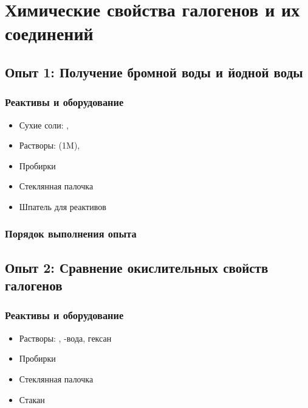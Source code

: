 \documentclass[a4paper, 12pt]{article}
\begin{document}
\newpage


\section{Химические свойства галогенов и их соединений}

\subsection{Опыт 1: Получение бромной воды и йодной воды}

\subsubsection{Реактивы и оборудование}

\begin{itemize}
	\item Сухие соли: , 
	\item Растворы:  (1M), 
	
	\item Пробирки
	
	\item Стеклянная палочка
	
	\item Шпатель для реактивов
\end{itemize}

\subsubsection{Порядок выполнения опыта}

\subsection{Опыт 2: Сравнение окислительных свойств галогенов}

\subsubsection{Реактивы и оборудование}

\begin{itemize}
	\item Растворы: , -вода, гексан
	
	\item Пробирки
	
	\item Стеклянная палочка
	
	\item Стакан
\end{itemize}
\end{document}
